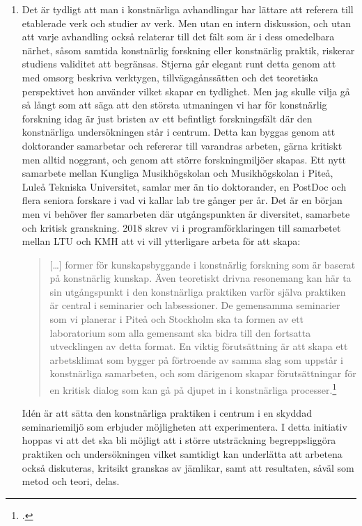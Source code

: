 \documentclass[11pt]{article}
\begin{document}
\begin{enumerate}
  \item Det är tydligt att man i konstnärliga avhandlingar har lättare
    att referera till etablerade verk och studier av verk. Men utan en
    intern diskussion, och utan att varje avhandling också relaterar
    till det fält som är i dess omedelbara närhet, såsom samtida
    konstnärlig forskning eller konstnärlig praktik, riskerar studiens
    validitet att begränsas. Stjerna går elegant runt detta genom att med omsorg
    beskriva verktygen, tillvägagånssätten och det teoretiska
    perspektivet hon använder vilket skapar en tydlighet. Men jag
    skulle vilja gå så långt som att säga att den största utmaningen
    vi har för konstnärlig forskning idag är just bristen av ett
    befintligt forskningsfält där den konstnärliga undersökningen står
    i centrum. Detta kan byggas genom att doktorander samarbetar och
    refererar till varandras arbeten, gärna kritiskt men alltid
    noggrant, och genom att större forskningmiljöer skapas. Ett nytt
    samarbete mellan Kungliga Musikhögskolan och Musikhögskolan i
    Piteå, Luleå Tekniska Universitet, samlar mer än tio doktorander,
    en PostDoc och flera seniora forskare i vad vi kallar lab tre
    gånger per år. Det är en början men vi behöver fler samarbeten där
    utgångspunkten är diversitet, samarbete och kritisk
    granskning. 2018 skrev vi i programförklaringen till samarbetet
    mellan LTU och KMH att vi vill ytterligare arbeta för att skapa:
    \begin{quote} [\ldots] former för kunskapsbyggande i konstnärlig
        forskning som är baserat på konstnärlig kunskap. Även
        teoretiskt drivna resonemang kan här ta sin utgångspunkt i den
        konstnärliga praktiken varför själva praktiken är central i
        seminarier och labsessioner. De gemensamma seminarier som vi
        planerar i Piteå och Stockholm ska ta formen av ett
        laboratorium som alla gemensamt ska bidra till den fortsatta
        utvecklingen av detta format. En viktig förutsättning är att
        skapa ett arbetsklimat som bygger på förtroende av samma slag
        som uppstår i konstnärliga samarbeten, och som därigenom
        skapar förutsättningar för en kritisk dialog som kan gå på
        djupet in i konstnärliga processer.\footcite{frisk2018:irl}
    \end{quote}
    Idén är att sätta den konstnärliga praktiken i centrum i en
    skyddad seminariemiljö som erbjuder möjligheten att
    experimentera. I detta initiativ hoppas vi att det ska bli möjligt
    att i större utsträckning begreppsliggöra praktiken och
    undersökningen vilket samtidigt kan underlätta att arbetena också
    diskuteras, kritsikt granskas av jämlikar, samt att resultaten,
    såväl som metod och teori, delas.
    

\end{enumerate}
\end{document}
